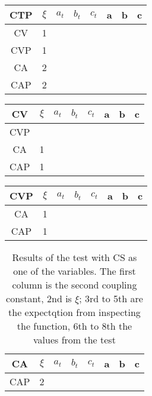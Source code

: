 \documentclass[twocolumn]{article}
\begin{document}
\begin{table}[H]
	\begin{tabular}{|c|c|c|c|c|c|c|c|}
		\hline
		CTP & $\xi $& $a_t$ & $b_t$ & $c_t$ & a & b & c \\
		\hline
		CV & 1 &   &   &   &   &   &   \\
		\hline
		CVP & 1 &   &   &   &   &   &   \\
		\hline
		CA & 2 &   &   &   &   &   &   \\
		\hline
		CAP & 2 &   &   &   &   &   &   \\
		\hline
	\end{tabular}
\end{table}

\begin{table}[H]
	\begin{tabular}{|c|c|c|c|c|c|c|c|}
		\hline
		CV & $\xi $& $a_t$ & $b_t$ & $c_t$ & a & b & c \\
		\hline
		CVP &   &   &   &   &   &   &   \\
		\hline
		CA & 1 &   &   &   &   &   &   \\
		\hline
		CAP & 1 &   &   &   &   &   &   \\
		\hline
	\end{tabular}
\end{table}

\begin{table}[H]
	\begin{tabular}{|c|c|c|c|c|c|c|c|}
		\hline
		CVP & $\xi $& $a_t$ & $b_t$ & $c_t$ & a & b & c \\
		\hline
		CA & 1 &   &   &   &   &   &   \\
		\hline
		CAP & 1 &   &   &   &   &   &   \\
		\hline
	\end{tabular}
\end{table}

\begin{table}[H]
	\begin{tabular}{|c|c|c|c|c|c|c|c|}
		\hline
		CA & $\xi $& $a_t$ & $b_t$ & $c_t$ & a & b & c \\
		\hline
		CAP & 2 &   &   &   &   &   &   \\
		\hline
	\end{tabular}
	\caption{Results of the test with CS as one of the variables. The first column is the second coupling constant, 2nd is $\xi$; 3rd to 5th are the expectqtion from inspecting the function, 6th to 8th the values from the test}
\end{table}
\end{document}
